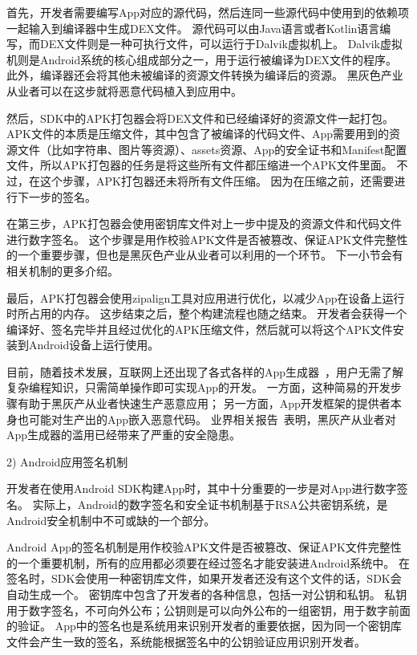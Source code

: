 首先，开发者需要编写App对应的源代码，然后连同一些源代码中使用到的依赖项一起输入到编译器中生成DEX文件。
源代码可以由Java语言或者Kotlin语言编写，而DEX文件则是一种可执行文件，可以运行于Dalvik虚拟机上。
Dalvik虚拟机则是Android系统的核心组成部分之一，用于运行被编译为DEX文件的程序。
此外，编译器还会将其他未被编译的资源文件转换为编译后的资源。
黑灰色产业从业者可以在这步就将恶意代码植入到应用中。

然后，SDK中的APK打包器会将DEX文件和已经编译好的资源文件一起打包。
APK文件的本质是压缩文件，其中包含了被编译的代码文件、App需要用到的资源文件（比如字符串、图片等资源）、assets资源、App的安全证书和Manifest配置文件，所以APK打包器的任务是将这些所有文件都压缩进一个APK文件里面。
不过，在这个步骤，APK打包器还未将所有文件压缩。
因为在压缩之前，还需要进行下一步的签名。

在第三步，APK打包器会使用密钥库文件对上一步中提及的资源文件和代码文件进行数字签名。
这个步骤是用作校验APK文件是否被篡改、保证APK文件完整性的一个重要步骤，但也是黑灰色产业从业者可以利用的一个环节。
下一小节会有相关机制的更多介绍。

最后，APK打包器会使用zipalign工具对应用进行优化，以减少App在设备上运行时所占用的内存。
这步结束之后，整个构建流程也随之结束。
开发者会获得一个编译好、签名完毕并且经过优化的APK压缩文件，然后就可以将这个APK文件安装到Android设备上运行使用。

目前，随着技术发展，互联网上还出现了各式各样的App生成器~\cite{anjian, iApp}，用户无需了解复杂编程知识，只需简单操作即可实现App的开发。
一方面，这种简易的开发步骤有助于黑灰产从业者快速生产恶意应用；
另一方面，App开发框架的提供者本身也可能对生产出的App嵌入恶意代码。
业界相关报告~\cite{anquanke_framework}表明，黑灰产从业者对App生成器的滥用已经带来了严重的安全隐患。

2) Android应用签名机制

开发者在使用Android SDK构建App时，其中十分重要的一步是对App进行数字签名。
实际上，Android的数字签名和安全证书机制基于RSA公共密钥系统，是Android安全机制中不可或缺的一个部分。

Android App的签名机制是用作校验APK文件是否被篡改、保证APK文件完整性的一个重要机制，所有的应用都必须要在经过签名才能安装进Android系统中。
在签名时，SDK会使用一种密钥库文件，如果开发者还没有这个文件的话，SDK会自动生成一个。
密钥库中包含了开发者的各种信息，包括一对公钥和私钥。
私钥用于数字签名，不可向外公布；公钥则是可以向外公布的一组密钥，用于数字前面的验证。
App中的签名也是系统用来识别开发者的重要依据，因为同一个密钥库文件会产生一致的签名，系统能根据签名中的公钥验证应用识别开发者。

